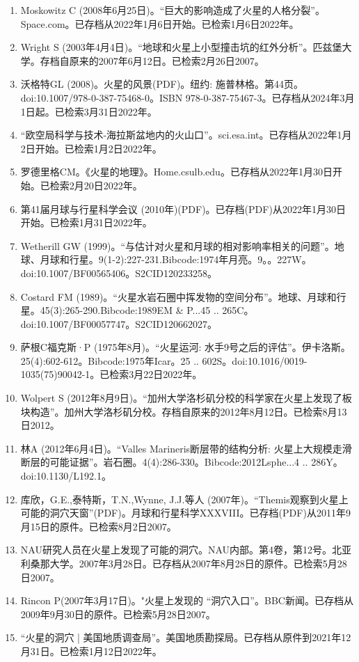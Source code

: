 \begin{enumerate}
\item Moskowitz C (2008年6月25日)。“巨大的影响造成了火星的人格分裂”。Space.com。已存档从2022年1月6日开始。已检索1月6日2022年。
\item Wright S (2003年4月4日)。“地球和火星上小型撞击坑的红外分析”。匹兹堡大学。存档自原来的2007年6月12日。已检索2月26日2007。
\item 沃格特GL (2008)。火星的风景(PDF)。纽约: 施普林格。第44页。doi:10.1007/978-0-387-75468-0。ISBN  978-0-387-75467-3。已存档从2024年3月1日起。已检索3月31日2022年。
\item “欧空局科学与技术-海拉斯盆地内的火山口”。sci.esa.int。已存档从2022年1月2日开始。已检索1月2日2022年。
\item 罗德里格CM。《火星的地理》。Home.csulb.edu。已存档从2022年1月30日开始。已检索2月20日2022年。
\item 第41届月球与行星科学会议 (2010年)(PDF)。已存档(PDF)从2022年1月30日开始。已检索1月31日2022年。
\item Wetherill GW (1999)。“与估计对火星和月球的相对影响率相关的问题”。地球、月球和行星。9(1-2):227-231.Bibcode:1974年月亮。9。。227W。doi:10.1007/BF00565406。S2CID120233258。 
\item Costard FM (1989)。“火星水岩石圈中挥发物的空间分布”。地球、月球和行星。45(3):265-290.Bibcode:1989EM & P...45 .. 265C。doi:10.1007/BF00057747。S2CID120662027。 
\item 萨根C福克斯·P (1975年8月)。“火星运河: 水手9号之后的评估”。伊卡洛斯。25(4):602-612。Bibcode:1975年Icar。25 .. 602S。doi:10.1016/0019-1035(75)90042-1。已检索3月22日2022年。
\item Wolpert S (2012年8月9日)。“加州大学洛杉矶分校的科学家在火星上发现了板块构造”。加州大学洛杉矶分校。存档自原来的2012年8月12日。已检索8月13日2012。
\item 林A (2012年6月4日)。“Valles Marineris断层带的结构分析: 火星上大规模走滑断层的可能证据”。岩石圈。4(4):286-330。Bibcode:2012Lsphe...4 .. 286Y。doi:10.1130/L192.1。
\item 库欣，G.E.,泰特斯，T.N.,Wynne, J.J.等人 (2007年)。“Themis观察到火星上可能的洞穴天窗”(PDF)。月球和行星科学XXXVIII。已存档(PDF)从2011年9月15日的原件。已检索8月2日2007。
\item NAU研究人员在火星上发现了可能的洞穴。NAU内部。第4卷，第12号。北亚利桑那大学。2007年3月28日。已存档从2007年8月28日的原件。已检索5月28日2007。
\item Rincon P(2007年3月17日)。"火星上发现的 “洞穴入口”。BBC新闻。已存档从2009年9月30日的原件。已检索5月28日2007。
\item “火星的洞穴 | 美国地质调查局”。美国地质勘探局。已存档从原件到2021年12月31日。已检索1月12日2022年。

\end{enumerate}
